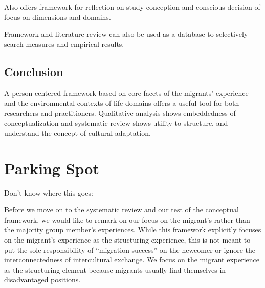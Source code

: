 \documentclass[man, 12pt, a4paper]{apa7}
\begin{document}
Also offers framework for reflection on study conception and conscious decision of focus on dimensions and domains.

Framework and literature review can also be used as a database to selectively search measures and empirical results.

\subsection{Conclusion}
A person-centered framework based on core facets of the migrants’ experience and the environmental contexts of life domains offers a useful tool for both researchers and practitioners. Qualitative analysis shows embeddedness of conceptualization and systematic review shows utility to structure, and understand the concept of cultural adaptation.


\section{Parking Spot}
Don't know where this goes:

Before we move on to the systematic review and our test of the conceptual framework, we would like to remark on our focus on the migrant's rather than the majority group member's experiences. 
While this framework explicitly focuses on the migrant's experience as the structuring experience, this is not meant to put the sole responsibility of ``migration success'' on the newcomer or ignore the interconnectedness of intercultural exchange. We focus on the migrant experience as the structuring element because migrants usually find themselves in disadvantaged positions. 
\end{document}
